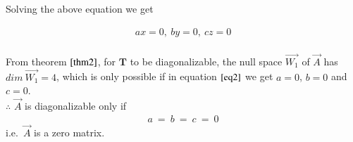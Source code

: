 \documentclass[journal,12pt,twocolumn]{IEEEtran}
\begin{document}
	Solving the above equation we get
	
	\begin{align}\label{eq2}
	    ax = 0,\ by = 0,\ cz = 0 \\ 
	\end{align}
	
	From theorem $\ref{thm2}$, for $\mathbf{T}$ to be diagonalizable, the null space $\Vec{W_1}$ of $\vec{A}$ has $dim\ \Vec{W_1} = 4$, which is only possible if in equation $\eqref{eq2}$ we get $a = 0$, $b = 0$ and $c = 0$.\\
	$\therefore$ $\Vec{A}$ is diagonalizable only if
	\begin{align}
	    a \ = \ b  \ = \ c \ = \ 0
	\end{align}
	i.e.\ $\Vec{A}$ is a zero matrix.
\end{document}
